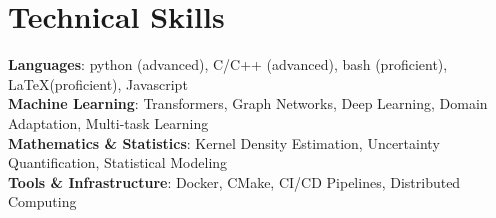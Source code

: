 \documentclass[letterpaper,11pt]{article}
\begin{document}
\section{Technical Skills}
    \vspace{-7pt}
    \begin{itemize}
    [leftmargin=0.15in, label={}]{\item{
        \textbf{Languages}{: python (advanced), C/C++ (advanced), bash (proficient), \LaTeX (proficient), Javascript} \\
       \textbf{Machine Learning}{: Transformers, Graph Networks, Deep Learning, Domain Adaptation, Multi-task Learning} \\
       \textbf{Mathematics \& Statistics}{: Kernel Density Estimation, Uncertainty Quantification, Statistical Modeling} \\
        \textbf{Tools \& Infrastructure}{: Docker, CMake, CI/CD Pipelines, Distributed Computing}\\
        }}
    \end{itemize}


\end{document}
